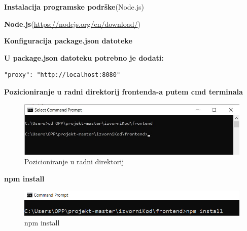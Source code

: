 		   	\noindent {}
		   		\begin{packed_enum}
				
					\item \textbf{Instalacija programske podrške}(Node.js)
    					\begin{packed_item}
                			\item \textbf{Node.js}(\url{https://nodejs.org/en/download/})
                		
    		      \end{packed_item}
					\item \textbf{Konfiguracija package.json datoteke}
					\begin{packed_item}
                			\item \textbf{U package.json datoteku potrebno je dodati: }
                			\begin{verbatim}"proxy": "http://localhost:8080"
                			\end{verbatim}
                		
    		      \end{packed_item}
					
    					
    		            
    		  \item \textbf{Pozicioniranje u radni direktorij frontenda-a putem cmd terminala}
    		            \begin{figure}[H]
    					\includegraphics[scale=1]{dokumentacija/slike/frontend/prva.jpg}
    					\centering
    					\caption{Pozicioniranje u radni direktorij}
    					\label{fig:pozicioniranje2}
    		            \end{figure}
    		            
    		 \item \textbf{npm install}
    		            \begin{figure}[H]
    					\includegraphics[scale=0.9]{dokumentacija/slike/frontend/treca.png}
    					\centering
    					\caption{npm install}
    					\label{fig:npm install}
    		            \end{figure}
    		            

\end{packed_enum}
